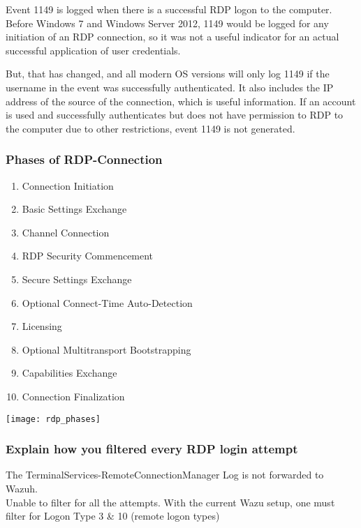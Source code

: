 Event 1149 is logged when there is a successful RDP logon to the computer. Before Windows 7 and Windows Server 2012, 1149 would be logged for any initiation of an RDP connection, so it was not a useful indicator for an actual successful application of user credentials.

But, that has changed, and all modern OS versions will only log 1149 if the username in the event was successfully authenticated. It also includes the IP address of the source of the connection, which is useful information. If an account is used and successfully authenticates but does not have
permission to RDP to the computer due to other restrictions, event 1149 is not generated.

\newpage

\subsubsection{Phases of RDP-Connection}

\begin{minipage}{0.45\linewidth}
    \begin{enumerate}
        \item Connection Initiation
        \item Basic Settings Exchange
        \item Channel Connection
        \item RDP Security Commencement
        \item Secure Settings Exchange
        \item Optional Connect-Time Auto-Detection
        \item Licensing
        \item Optional Multitransport Bootstrapping
        \item Capabilities Exchange
        \item Connection Finalization
    \end{enumerate}
\end{minipage}
\begin{minipage}{0.5\linewidth}
    \begin{center}
        \texttt{[image: rdp\_phases]}
        \vspace{-8pt}
    \end{center}
\end{minipage}

\subsubsection{Explain how you filtered every RDP login attempt}
The TerminalServices-RemoteConnectionManager Log is not forwarded to Wazuh.\\
Unable to filter for all the attempts.
With the current Wazu setup, one must filter for Logon Type 3 \& 10 (remote logon types)\\

